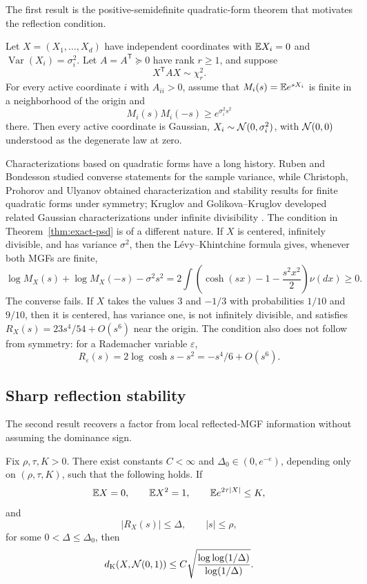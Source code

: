 The first result is the positive-semidefinite quadratic-form theorem that motivates the reflection condition.
\begin{theorem}\label{thm:exact-psd}
Let $X=(X_1,\ldots,X_d)$ have independent coordinates with $\mathbb E X_i=0$ and $\operatorname{Var}(X_i)=\sigma_i^2$. Let $A=A^{\mathsf T}\succeq0$ have rank $r\ge1$, and suppose
\[
X^{\mathsf T}AX\sim\chi_r^2.
\]
For every active coordinate $i$ with $A_{ii}>0$, assume that $M_i(s)=\mathbb E e^{sX_i}$ is finite in a neighborhood of the origin and
\[
M_i(s)M_i(-s)\ge e^{\sigma_i^2s^2}
\]
there. Then every active coordinate is Gaussian, $X_i\sim\mathcal N(0,\sigma_i^2)$, with $\mathcal N(0,0)$ understood as the degenerate law at zero.
\end{theorem}

Characterizations based on quadratic forms have a long history. Ruben and Bondesson studied converse statements for the sample variance, while Christoph, Prohorov and Ulyanov obtained characterization and stability results for finite quadratic forms under symmetry; Kruglov and Golikova--Kruglov developed related Gaussian characterizations under infinite divisibility \cite{Ruben1974,Ruben1978,Bondesson1977,ChristophProhorovUlyanov2001,Kruglov2013,GolikovaKruglov2015}. The condition in Theorem~\ref{thm:exact-psd} is of a different nature. If $X$ is centered, infinitely divisible, and has variance $\sigma^2$, then the L\'evy--Khintchine formula gives, whenever both MGFs are finite,
\[
\log M_X(s)+\log M_X(-s)-\sigma^2s^2
 =2\int\left(\cosh(sx)-1-\frac{s^2x^2}{2}\right)\nu(dx)\ge0.
\]
The converse fails. If $X$ takes the values $3$ and $-1/3$ with probabilities $1/10$ and $9/10$, then it is centered, has variance one, is not infinitely divisible, and satisfies $R_X(s)=23s^4/54+O(s^6)$ near the origin. The condition also does not follow from symmetry: for a Rademacher variable $\varepsilon$,
\[
R_\varepsilon(s)=2\log\cosh s-s^2=-s^4/6+O(s^6).
\]

\subsection*{Sharp reflection stability}

The second result recovers a factor from local reflected-MGF information without assuming the dominance sign.
\begin{theorem}\label{thm:sharp-upper}
Fix $\rho,\tau,K>0$. There exist constants $C<\infty$ and $\Delta_0\in(0,e^{-e})$, depending only on $(\rho,\tau,K)$, such that the following holds. If
\[
\mathbb E X=0,\qquad \mathbb E X^2=1,\qquad \mathbb E e^{2\tau|X|}\le K,
\]
and
\[
|R_X(s)|\le\Delta,
\qquad |s|\le\rho,
\]
for some $0<\Delta\le\Delta_0$, then
\[
d_{\mathrm K}(X,\mathcal N(0,1))
\le C\sqrt{\frac{\log\log(1/\Delta)}{\log(1/\Delta)}}.
\]
\end{theorem}

